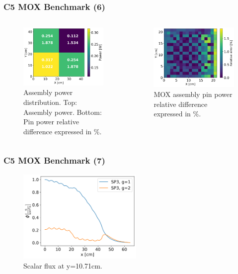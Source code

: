 \begin{frame}
\frametitle{C5 MOX Benchmark (6)}

\begin{columns}
    \column[t]{5.5cm}
    \begin{figure}[htbp!]
        \begin{center}
            \includegraphics[width=6.cm]{figures/distrib}
        \end{center}
        \caption{Assembly power distribution. Top: Assembly power. Bottom: Pin power relative difference expressed in \%.}
    \end{figure}

    \column[t]{5.5cm}
    \begin{figure}[htbp!]
        \begin{center}
            \includegraphics[width=6.cm]{figures/mox-r-pin-by-pin}
        \end{center}
        \caption{MOX assembly pin power relative difference expressed in \%.}
    \end{figure}

\end{columns}
\end{frame}


\begin{frame}
\frametitle{C5 MOX Benchmark (7)}

    \begin{figure}[htbp!]
        \begin{center}
            \includegraphics[width=6cm]{figures/sp3-flux-output-correct}
        \end{center}
        \caption{Scalar flux at y=10.71cm.}
    \end{figure}

\end{frame}


